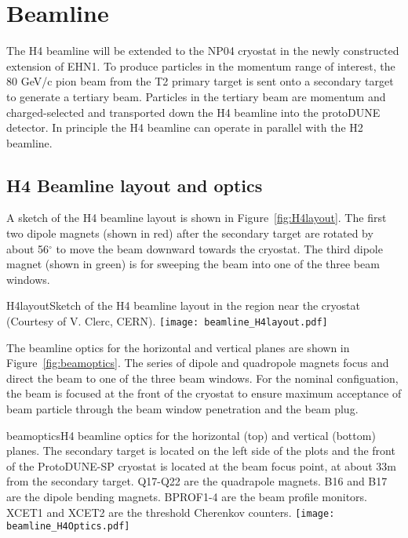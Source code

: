 \section{Beamline}
\label{sec:h4beamline}

The H4 beamline will be extended to the NP04 cryostat in the newly constructed extension of EHN1. To produce particles in the momentum range of interest, the 80 GeV/c pion beam from the T2 primary target is sent onto a secondary target to generate a tertiary beam. Particles in the tertiary beam are momentum and charged-selected and transported down the H4 beamline into the protoDUNE detector. In principle the H4 beamline can operate in parallel with the H2 beamline. %

\subsection{H4 Beamline layout and optics}

A sketch of the H4 beamline layout is shown in Figure~\ref{fig:H4layout}. The first two dipole magnets (shown in red) after the secondary target are rotated by about 56$^\circ$ to move the beam downward towards the cryostat. The third dipole magnet (shown in green) is for sweeping the beam into one of the three beam windows.
\begin{cdrfigure}{H4layout}{Sketch of the H4 beamline layout in the region near the cryostat (Courtesy of V. Clerc, CERN).}
  \texttt{[image: beamline\_H4layout.pdf]}
\end{cdrfigure}


The beamline optics for the horizontal and vertical planes are shown in Figure~\ref{fig:beamoptics}. The series of dipole and quadropole magnets focus and direct the beam to one of the three beam windows. For the nominal configuation, the beam is focused at the front of the cryostat to ensure maximum acceptance of beam particle through the beam window penetration and the beam plug.

\begin{cdrfigure}{beamoptics}{H4 beamline optics for the horizontal (top) and vertical (bottom) planes. The secondary target is located on the left side of the plots and the front of the ProtoDUNE-SP cryostat is located at the beam focus point, at about 33m from the secondary target. Q17-Q22 are the quadrapole magnets. B16 and B17 are the dipole bending magnets. BPROF1-4 are the beam profile monitors. XCET1 and XCET2 are the threshold Cherenkov counters. }
  \texttt{[image: beamline\_H4Optics.pdf]}
\end{cdrfigure}


